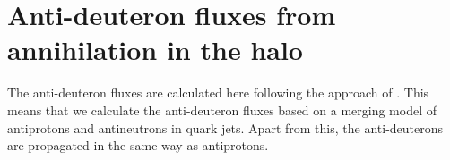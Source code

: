 
\section{Anti-deuteron fluxes from annihilation in the halo}

The anti-deuteron fluxes are calculated here following the approach of
\cite{dbar}. This means that we calculate the anti-deuteron fluxes
based on a merging model of antiprotons and antineutrons in quark
jets. Apart from this, the anti-deuterons are propagated in the same
way as antiprotons.
